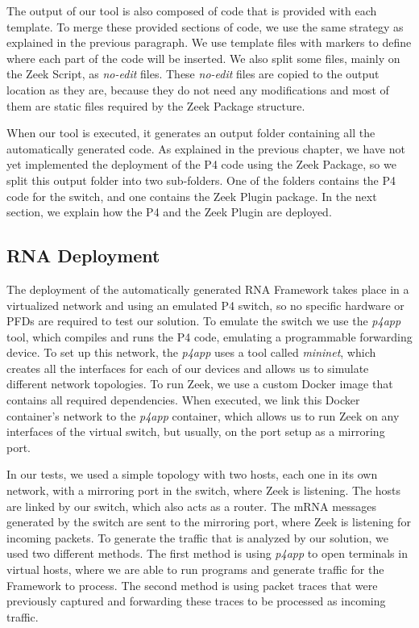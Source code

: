 The output of our tool is also composed of code that is provided with each template. To merge these provided sections of code, we use the same strategy as explained in the previous paragraph. We use template files with markers to define where each part of the code will be inserted. We also split some files, mainly on the Zeek Script, as \textit{no-edit} files. These \textit{no-edit} files are copied to the output location as they are, because they do not need any modifications and most of them are static files required by the Zeek Package structure.

When our tool is executed, it generates an output folder containing all the automatically generated code. As explained in the previous chapter, we have not yet implemented the deployment of the P4 code using the Zeek Package, so we split this output folder into two sub-folders. One of the folders contains the P4 code for the switch, and one contains the Zeek Plugin package. In the next section, we explain how the P4 and the Zeek Plugin are deployed.

\subsection{RNA Deployment}
\label{sec:evaluation:deployment}

The deployment of the automatically generated RNA Framework takes place in a virtualized network and using an emulated P4 switch, so no specific hardware or PFDs are required to test our solution. To emulate the switch we use the \textit{p4app} tool, which compiles and runs the P4 code, emulating a programmable forwarding device. To set up this network, the \textit{p4app} uses a tool called \textit{mininet}, which creates all the interfaces for each of our devices and allows us to simulate different network topologies. To run Zeek, we use a custom Docker image that contains all required dependencies. When executed, we link this Docker container's network to the \textit{p4app} container, which allows us to run Zeek on any interfaces of the virtual switch, but usually, on the port setup as a mirroring port.

In our tests, we used a simple topology with two hosts, each one in its own network, with a mirroring port in the switch, where Zeek is listening. The hosts are linked by our switch, which also acts as a router. The mRNA messages generated by the switch are sent to the mirroring port, where Zeek is listening for incoming packets. To generate the traffic that is analyzed by our solution, we used two different methods. The first method is using \textit{p4app} to open terminals in virtual hosts, where we are able to run programs and generate traffic for the Framework to process. The second method is using packet traces that were previously captured and forwarding these traces to be processed as incoming traffic.

